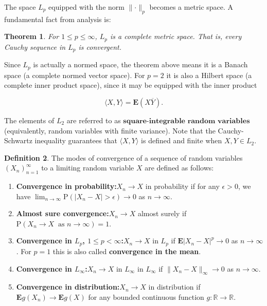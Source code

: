 \documentclass[11pt]{report}
\newcommand{\R}{\mathbb{R}}
\theoremstyle{plain}
\newtheorem{thm}{Theorem}[chapter]
\theoremstyle{definition}
\newtheorem{defn}[thm]{Definition}
\begin{document}
\noindent The space $L_p$ equipped with the norm
$\lVert \cdot \rVert_p$ becomes a metric space. A
fundamental fact from analysis is:

\begin{thm}
For $1\le p\le \infty$, $L_p$ is a complete metric
space. That is, every Cauchy sequence in $L_p$ is
convergent.
\end{thm}

\noindent Since $L_p$ is actually a normed space, the theorem
above means it is a Banach space (a complete normed
vector space). For $p=2$ it is also a Hilbert space
(a complete inner product space), since it may be
equipped with the inner product

\[
\langle X,Y\rangle = \mathbf{E}(X\overline{Y}).
\]

\noindent The elements of $L_2$ are referred to as
$\textbf{square-integrable random variables}$
(equivalently, random variables with finite variance).
Note that the Cauchy-Schwartz inequality guarantees
that $\langle X,Y\rangle$ is defined and finite when
$X,Y\in L_2$.

\begin{defn}
The modes of convergence of a sequence of random
variables $(X_n)_{n=1}^\infty$ to a limiting random
variable $X$ are defined as follows:

\begin{enumerate}[label=\arabic*.]
\item \textbf{Convergence in probability:}$X_n \to X$ in
probability if for any $\epsilon>0$, we have
$\lim_{n\to\infty} \mathrm{P}(|X_n-X|>\epsilon)\to 0$
as $n\to\infty$.

\item \textbf{Almost sure convergence:}$X_n\to X$ almost surely
if
$\mathrm{P}(X_n\to X\ \textrm{ as }n\to\infty) = 1$.

\item \textbf{Convergence in $L_p$, $1\le p<\infty$:}$X_n\to X$
in $L_p$ if $\mathbf{E}|X_n-X|^p \to 0$ as
$n\to\infty$. For $p=1$ this is also called
\textbf{convergence in the mean}.

\item \textbf{Convergence in $L_\infty$:}$X_n\to X$ in $L_\infty$
in $L_\infty$ if $\lVert X_n-X\rVert_\infty\to 0$ as
$n\to\infty$.

\item \textbf{Convergence in distribution:}$X_n\to X$ in
distribution if $\mathbf{E} g(X_n)\to \mathbf{E} g(X)$
for any bounded continuous function $g:\R\to\R$.
\end{enumerate}

\end{defn}
\end{document}
